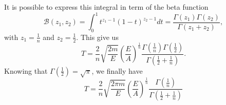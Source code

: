 \begin{subproblem}
{\begin{equation*}
\end{equation*}
It is possible to express this integral in term of the beta function
\begin{equation*}
    \mathcal{B}(z_1,z_2) = \int_0^1  t^{z_1-1}\left( 1 - t \right)^{z_2-1}dt = \frac{\Gamma\left(z_1\right)\Gamma\left(z_2\right)}{\Gamma\left(z_1+z_2\right)},
\end{equation*}
with $z_1 = \frac{1}{n}$ and $z_2 = \frac{1}{2}$. This give us
\begin{equation*}
    T = \frac{2}{n}\sqrt{\frac{2m}{E}} \left(\frac{E}{A}\right)^{\frac{1}{n}} \frac{\Gamma\left(\frac{1}{n}\right)\Gamma\left(\frac{1}{2}\right)}{\Gamma\left(\frac{1}{2}+\frac{1}{n}\right)} .
\end{equation*}
Knowing that $\Gamma\left(\frac{1}{2}\right) = \sqrt{\pi}$, we finally have
}
{
\begin{equation*}
    T = \frac{2}{n}\sqrt{\frac{2\pi m }{E}} \left(\frac{E}{A}\right)^{\frac{1}{n}} \frac{\Gamma\left(\frac{1}{n}\right)}{\Gamma\left(\frac{1}{2}+\frac{1}{n}\right)}
\end{equation*}
}
\end{subproblem}

